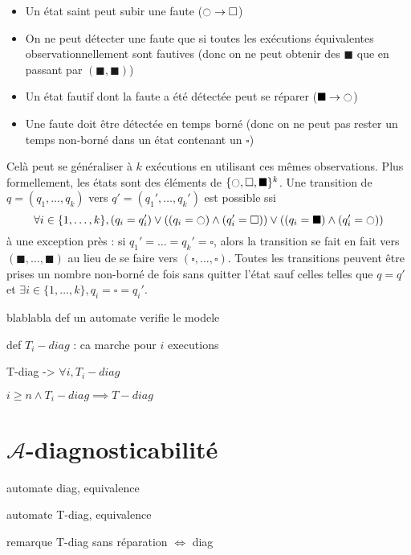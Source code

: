 \documentclass[10pt,a4paper]{article}
\newcommand{\es}{\square}
\newcommand{\fs}{\blacksquare}
\newcommand{\ec}{\ocircle}
\begin{document}
\begin{itemize}
	\item Un état saint peut subir une faute ($\ec \to \es$)
	\item On ne peut détecter une faute que si toutes les exécutions équivalentes observationnellement sont fautives (donc on ne peut obtenir des $\fs$ que en passant par $(\fs, \fs)$)
	\item Un état fautif dont la faute a été détectée peut se réparer ($\fs\to \ec$)
	\item Une faute doit être détectée en temps borné (donc on ne peut pas rester un temps non-borné dans un état contenant un $\es$)
\end{itemize}

Celà peut se généraliser à $k$ exécutions en utilisant ces mêmes observations. Plus formellement, les états sont des éléments de $\{\ec, \es, \fs \}^k$. Une transition de $q=(q_1, \dots, q_k)$ vers $q'=(q_1',\dots,q_k')$ est possible ssi $$\forall i \in \{1, \dots, k\}, (q_i = q_i')\lor ((q_i = \ec) \land (q_i'=\es)) \lor ((q_i = \fs)\land (q_i' = \ec))$$
\`a une exception près : si $q_1'=\dots=q_k'=\es$, alors la transition se fait en fait vers $(\fs, \dots, \fs)$ au lieu de se faire vers $(\es, \dots, \es)$. Toutes les transitions peuvent être prises un nombre non-borné de fois sans quitter l'état sauf celles telles que $q= q'$ et $\exists i\in \{1, \dots, k\}, q_i = \es = q_i'$.

blablabla def un automate verifie le modele

def $T_i-diag$ : ca marche pour $i$ executions

T-diag -> $\forall i, T_i-diag$

$i\ge n \land T_i-diag \implies T-diag$


\section{$\mathcal{A}$-diagnosticabilit\'e}

automate diag, equivalence

automate T-diag, equivalence

remarque T-diag sans r\'eparation $ \iff $ diag
\end{document}
